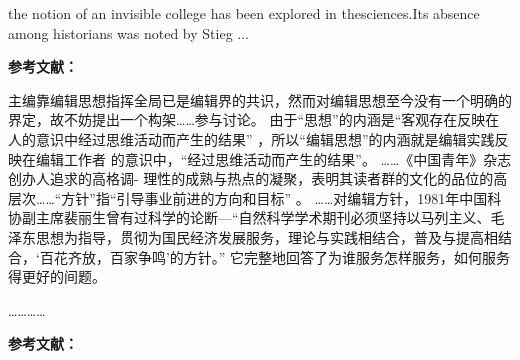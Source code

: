 \documentclass{article}
\newlength{\indentedpara}
\begin{document}
\setlength{\indentedpara}{\linewidth-2em}
\begin{refsection}
the notion of an invisible college has been explored in thesciences\cite{CRANE1972--}.Its absence among historians was noted by Stieg ...

\textbf{参考文献：}

\parbox{2em}{}\parbox{\indentedpara}{\printbibliography[heading=none]}
\end{refsection}

\eject

\pdfpagewidth=21cm \pdfpageheight=1.7cm
\begin{refsection}
\nocite{贾君枝2023编目,贾君枝2023短评}
\vspace{-5mm}
\parbox{2em}{}\parbox{\indentedpara}{\printbibliography[heading=none]}
\end{refsection}


\eject

\pdfpagewidth=21cm \pdfpageheight=2.2cm
\begin{refsection}
\nocite{KENNEDY1975-311-386,KENNEDY1975-339-360}

\parbox{2em}{}\parbox{\indentedpara}{\printbibliography[heading=none]}
\end{refsection}


\eject

\pdfpagewidth=21cm \pdfpageheight=9.8cm
\begin{refsection}

主编靠编辑思想指挥全局已是编辑界的共识\cite{张忠智1997-33-34}，然而对编辑思想至今没有一个明确的界定，故不妨提出一个构架……参与讨论。
由于“思想”的内涵是“客观存在反映在人的意识中经过思维活动而产生的结果”
，所以“编辑思想”的内涵就是编辑实践反映在编辑工作者
的意识中，“经过思维活动而产生的结果”。
……《中国青年》杂志创办人追求的高格调-
理性的成熟与热点的凝聚\cite{刘彻东1998-38-39}，表明其读者群的文化的品位的高层次……“方针”指“引导事业前进的方向和目标”
。
……对编辑方针，1981年中国科协副主席裴丽生曾有过科学的论断—“自然科学学术期刊必须坚持以马列主义、毛泽东思想为指导，贯彻为国民经济发展服务，理论与实践相结合，普及与提高相结合，‘百花齐放，百家争鸣’的方针。” \cite{裴丽生1981-2-10}它完整地回答了为谁服务怎样服务，如何服务得更好的间题。

…………


\textbf{参考文献：}

\newrefcontext[sorting=gb7714-2015]{}
\parbox{2em}{}\parbox{\indentedpara}{\printbibliography[heading=none]}
\end{refsection}
\end{document}
